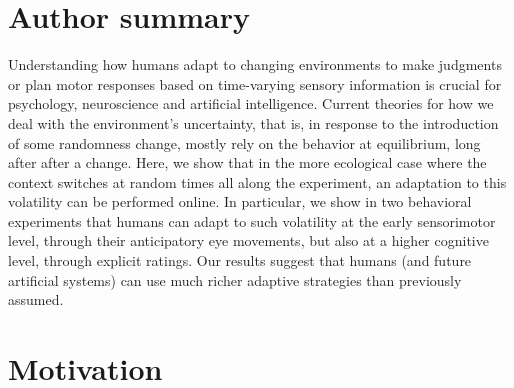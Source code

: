 \documentclass[10pt,letterpaper]{article}
\begin{document}
\section*{Author summary}
Understanding how humans adapt to changing environments to make judgments or plan motor responses based on time-varying sensory information is crucial for psychology, neuroscience and artificial intelligence. Current theories for how we deal with the environment's uncertainty, that is, in response to the introduction of some randomness change, mostly rely on the behavior at equilibrium, long after after a change. Here, we show that in the more ecological case where the context switches at random times all along the experiment, an adaptation to this volatility can be performed online. In particular, we show in two behavioral experiments that humans can adapt to such volatility at the early sensorimotor level, through their anticipatory eye movements, but also at a higher cognitive level, through explicit ratings. Our results suggest that humans (and future artificial systems) can use much richer adaptive strategies than previously assumed.
\section*{Motivation}
\label{sec:intro}
\end{document}

